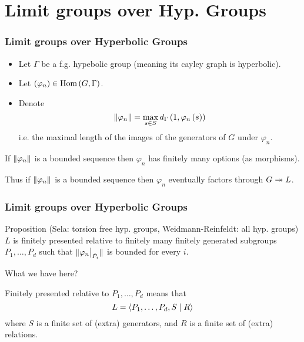 \documentclass{beamer}[10]
\renewcommand{\hom}{\text{Hom}}
\begin{document}
\section{Limit groups over Hyp. Groups}
\begin{frame} \frametitle{Limit groups over Hyperbolic Groups}

    \begin{itemize}
        \item Let $\Gamma$ be a f.g. hypebolic group (meaning its cayley graph is hyperbolic).
        \item \pause Let $\rb{\varphi_n} \in \hom\rb{G,\Gamma}$. 
        \item \pause Denote 
            \begin{equation*}
                \lVert \varphi_n \rVert = \max_{s\in S} d_\Gamma \left( 1,\varphi_n\left(  s  \right) \right)
            \end{equation*}
            i.e. the maximal length of the images of the generators of $G$ under $\varphi_n$.\pause
    \end{itemize}
    
    
    \begin{fact}
        If $\lVert \varphi_n \rVert$ is a bounded sequence then $\varphi_n$ has finitely many options (as morphisms).
        
        Thus if $\lVert \varphi_n \rVert$ is a bounded sequence then $\varphi_n$ eventually factors through $G\twoheadrightarrow L$.
    \end{fact}

\end{frame}

\begin{frame}
    \frametitle{Limit groups over Hyperbolic Groups}\pause
    \begin{block}{Proposition (Sela: torsion free hyp. groups, Weidmann-Reinfeldt: all hyp. groups)}
        $L$ is finitely presented relative to finitely many finitely generated subgroups $P_1, \ldots, P_d$ such that $\lVert \varphi_{n}\big\vert_{\tilde{P}_i} \rVert$ is bounded for every $i$.
    \end{block}
    \pause
    {\Large What we have here?}
    \pause

    Finitely presented relative to $P_1, \ldots, P_d$ means that
    \begin{equation*}
        L = \left<  P_1, \ldots, P_d, S \mid R \right> 
    \end{equation*}
    \pause where $S$ is a finite set of (extra) generators\pause, and $R$ is a finite set of (extra) relations.

\end{frame}
\end{document}

